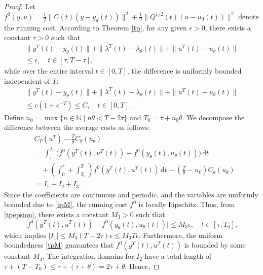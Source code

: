\documentclass{IEEEtran}
\begin{document}
	\begin{proof}
		Let $f^0(y,u) = \frac{1}{2} \|C(t)(y-y_d(t))\|^2 + \frac{1}{2} \|Q^{1/2}(t)(u-u_d(t))\|^2$ denote the running cost. According to Theorem \ref{tp}, for any given $\epsilon > 0$, there exists a constant $\tau > 0$ such that
		\begin{multline}\label{tpepsion}
			\|y^T(t)-y_\theta(t)\|+ \|\lambda^T(t)-\lambda_\theta(t)\| 
			+\|u^T(t)-u_\theta(t)\| \\ \leq \epsilon ,\quad t\in[\tau,T-\tau],
		\end{multline}
		while over the entire interval $t\in[0,T]$, the difference is uniformly bounded independent of $T$:
		\begin{multline}\label{tpM}
			\|y^T(t)-y_\theta(t)\|+ \|\lambda^T(t)-\lambda_\theta(t)\| 
			+\|u^T(t)-u_\theta(t)\|  \\
			\leq c(1+e^{-T})\leq C ,\quad t\in[0,T].
		\end{multline}
		Define $n_0 = \max \{ n \in \mathbb{N} \mid n\theta < T-2\tau \}$ and $T_0 = \tau + n_0\theta$. We decompose the difference between the average costs as follows:
		\begin{equation}
			\begin{split}
				&C_{T}(u^T) - \frac{T}{\theta} C_{\theta}(u_\theta) \\&= \int_\tau^{T_0} \big(f^0(y^T(t),u^T(t)) - f^0(y_\theta(t),u_\theta(t))\big)\,\mathrm{d}t \\
				&\quad + \left(\int_0^\tau + \int_{T_0}^T\right) f^0(y^T(t),u^T(t))\,\mathrm{d}t - \left(\frac{T}{\theta} - n_0\right)C_{\theta}(u_\theta) \\
				&= I_1 + I_2 + I_3.
			\end{split}
		\end{equation}
		Since the coefficients are continuous and periodic, and the variables are uniformly bounded due to \eqref{tpM}, the running cost $f^0$ is locally Lipschitz. Thus, from \eqref{tpepsion}, there exists a constant $M_3 > 0$ such that
		\begin{equation*}
			\big| f^0(y^T(t),u^T(t)) - f^0(y_\theta(t),u_\theta(t)) \big| \leq M_3 \epsilon, \quad t \in [\tau, T_0],
		\end{equation*}
		which implies $|I_1| \leq M_3 (T-2\tau)\epsilon \leq M_3 T \epsilon$. Furthermore, the uniform boundedness \eqref{tpM} guarantees that $f^0(y^T(t),u^T(t))$ is bounded by some constant $M_4$. The integration domains for $I_2$ have a total length of $\tau + (T - T_0) \leq \tau + (\tau + \theta) = 2\tau + \theta$. Hence,

\end{proof}
\end{document}
